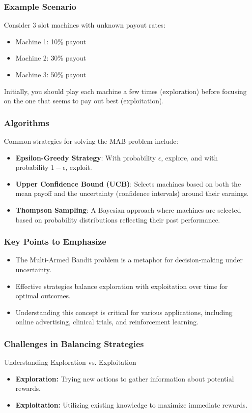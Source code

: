 \documentclass[aspectratio=169]{beamer}
\begin{document}
\begin{frame}[fragile]
    \frametitle{Example Scenario}
    Consider 3 slot machines with unknown payout rates:
    \begin{itemize}
        \item Machine 1: 10\% payout
        \item Machine 2: 30\% payout
        \item Machine 3: 50\% payout
    \end{itemize}
    Initially, you should play each machine a few times (exploration) before focusing on the one that seems to pay out best (exploitation).
\end{frame}

\begin{frame}[fragile]
    \frametitle{Algorithms}
    Common strategies for solving the MAB problem include:
    \begin{itemize}
        \item \textbf{Epsilon-Greedy Strategy}: 
        With probability \( \epsilon \), explore, and with probability \( 1 - \epsilon \), exploit.
        
        \item \textbf{Upper Confidence Bound (UCB)}: 
        Selects machines based on both the mean payoff and the uncertainty (confidence intervals) around their earnings.

        \item \textbf{Thompson Sampling}: 
        A Bayesian approach where machines are selected based on probability distributions reflecting their past performance.
    \end{itemize}
\end{frame}

\begin{frame}[fragile]
    \frametitle{Key Points to Emphasize}
    \begin{itemize}
        \item The Multi-Armed Bandit problem is a metaphor for decision-making under uncertainty.
        \item Effective strategies balance exploration with exploitation over time for optimal outcomes.
        \item Understanding this concept is critical for various applications, including online advertising, clinical trials, and reinforcement learning.
    \end{itemize}
\end{frame}

\begin{frame}[fragile]
    \frametitle{Challenges in Balancing Strategies}
    \begin{block}{Understanding Exploration vs. Exploitation}
        \begin{itemize}
            \item \textbf{Exploration:} Trying new actions to gather information about potential rewards.
            \item \textbf{Exploitation:} Utilizing existing knowledge to maximize immediate rewards.
        \end{itemize}
    \end{block}
\end{frame}
\end{document}
